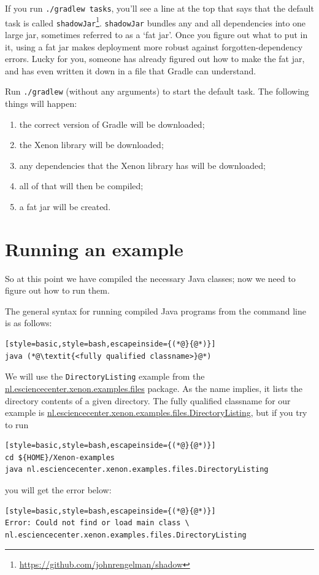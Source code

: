 \documentclass[12pt, a4paper, twoside, openany, titlepage]{book}
\begin{document}
If you run \texttt{./gradlew tasks}, you'll see a line at the top that says that the default task is called \texttt{shadowJar}\footnote{\url{https://github.com/johnrengelman/shadow}}. \texttt{shadowJar} bundles any and all dependencies into one large jar, sometimes referred to as a `fat jar'. Once you figure out what to put in it, using a fat jar makes deployment more robust against forgotten-dependency errors. Lucky for you, someone has already figured out how to make the fat jar, and has even written it down in a file that Gradle can understand.

Run \texttt{./gradlew} (without any arguments) to start the default task. The following things will happen:
\begin{enumerate}
\item{the correct version of Gradle will be downloaded;}
\item{the Xenon library will be downloaded;}
\item{any dependencies that the Xenon library has will be downloaded;}
\item{all of that will then be compiled;}
\item{a fat jar will be created.}
\end{enumerate}



\section{Running an example}

So at this point we have compiled the necessary Java classes; now we need to figure out how to run them.

The general syntax for running compiled Java programs from the command line is as follows:
\begin{lstlisting}[style=basic,style=bash,escapeinside={(*@}{@*)}]
java (*@\textit{<fully qualified classname>}@*)
\end{lstlisting}
We will use the \texttt{DirectoryListing} example from the \url{nl.esciencecenter.xenon.examples.files} package. As the name implies, it lists the directory contents of a given directory. The fully qualified classname for our example is \url{nl.esciencecenter.xenon.examples.files.DirectoryListing}, but if you try to run
\begin{lstlisting}[style=basic,style=bash,escapeinside={(*@}{@*)}]
cd ${HOME}/Xenon-examples
java nl.esciencecenter.xenon.examples.files.DirectoryListing
\end{lstlisting} %
you will get the error below:
\begin{lstlisting}[style=basic,style=bash,escapeinside={(*@}{@*)}]
Error: Could not find or load main class \
nl.esciencecenter.xenon.examples.files.DirectoryListing
\end{lstlisting}
\end{document}
